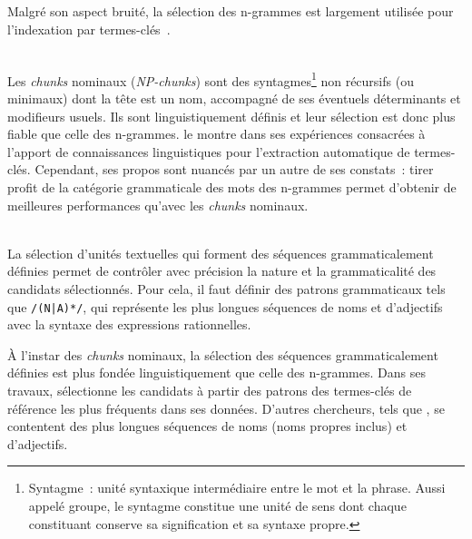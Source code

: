     Malgré son aspect bruité, la sélection des n-grammes est largement utilisée
    pour l'indexation par
    termes-clés~\cite{witten1999kea,hulth2003keywordextraction,medelyan2009humancompetitivetagging}.

    \begin{example}
    \end{example}

    ~\\Les \textit{chunks} nominaux
    (\textit{NP-chunks}) sont des syntagmes\footnote{Syntagme~: unité syntaxique
    intermédiaire entre le mot et la phrase. Aussi appelé groupe, le syntagme
    constitue une unité de sens dont chaque constituant conserve sa
    signification et sa syntaxe propre.} non récursifs (ou minimaux) dont la
    tête est un nom, accompagné de ses éventuels déterminants et modifieurs
    usuels. Ils sont linguistiquement définis et leur sélection est donc plus
    fiable que celle des n-grammes.  le
    montre dans ses expériences consacrées à l'apport de connaissances
    linguistiques pour l'extraction automatique de termes-clés. Cependant, ses
    propos sont nuancés par un autre de ses constats~: tirer profit de la
    catégorie grammaticale des mots des n-grammes permet d'obtenir de meilleures
    performances qu'avec les \textit{chunks} nominaux.

    \begin{example}
    \end{example}

    ~\\La sélection d'unités textuelles qui forment des séquences
    grammaticalement définies permet de contrôler
    avec précision la nature et la grammaticalité des candidats sélectionnés.
    Pour cela, il faut définir des patrons grammaticaux tels que \texttt{/(N|A)*/}, qui représente les plus longues séquences de noms et
    d'adjectifs avec la syntaxe des expressions rationnelles.

    À l'instar des \textit{chunks} nominaux, la sélection des séquences
    grammaticalement définies est plus fondée linguistiquement que celle des
    n-grammes. Dans ses travaux, 
    sélectionne les candidats à partir des patrons des termes-clés de référence
    les plus fréquents dans ses données. D'autres chercheurs,
    tels que , se contentent des plus longues
    séquences de noms (noms propres inclus) et d'adjectifs.

